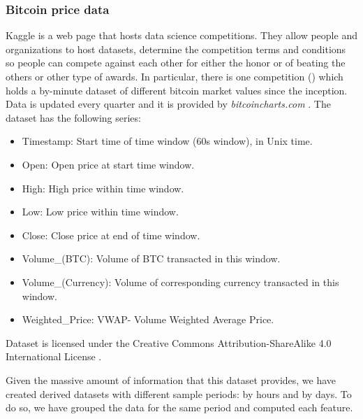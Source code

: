 \subsubsection{Bitcoin price data}
\label{sec:material_data_price_data}

Kaggle \cite{kaggle} is a web page that hosts data science competitions. They allow people and organizations to host datasets, determine the competition terms and conditions so people can compete against each other for either the honor or of beating the others or other type of awards. In particular, there is one competition (\cite{kaggle_btc}) which holds a by-minute dataset of different bitcoin market values since the inception. Data is updated every quarter and it is provided by \emph{bitcoincharts.com} \cite{bitcoin_charts}. The dataset has the following series:

\begin{itemize}
    \item Timestamp: Start time of time window (60s window), in Unix time\footnotemark.
    \item Open: Open price at start time window.
    \item High: High price within time window.
    \item Low: Low price within time window.
    \item Close: Close price at end of time window.
    \item Volume\_(BTC): Volume of BTC transacted in this window.
    \item Volume\_(Currency): Volume of corresponding currency transacted in this window.
    \item Weighted\_Price: VWAP- Volume Weighted Average Price.
\end{itemize}


Dataset is licensed under the Creative Commons Attribution-ShareAlike 4.0 International License \cite{cc_by_sa_4}.

Given the massive amount of information that this dataset provides, we have created derived datasets with different sample periods: by hours and by days. To do so, we have grouped the data for the same period and computed each feature.